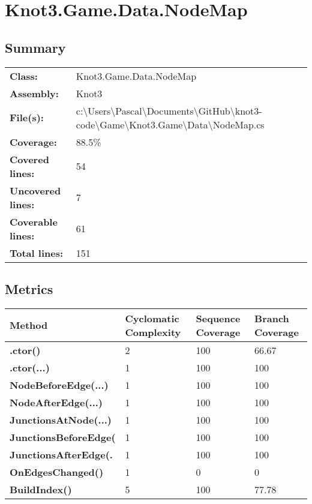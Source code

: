 \documentclass[a4paper,10pt]{article}
\begin{document}
\section{Knot3.Game.Data.NodeMap}
\subsection{Summary}
\begin{longtable}[l]{ll}
\textbf{Class:} & Knot3.Game.Data.NodeMap\\
\textbf{Assembly:} & Knot3\\
\textbf{File(s):} & \begin{minipage}[t]{12cm}{c:\textbackslash Users\textbackslash Pascal\textbackslash Documents\textbackslash GitHub\textbackslash knot3-code\textbackslash Game\textbackslash Knot3.Game\textbackslash Data\textbackslash NodeMap.cs}\end{minipage} \\
\textbf{Coverage:} & 88.5\%\\
\textbf{Covered lines:} & 54\\
\textbf{Uncovered lines:} & 7\\
\textbf{Coverable lines:} & 61\\
\textbf{Total lines:} & 151\\
\end{longtable}
\subsection{Metrics}
\begin{longtable}[l]{|l|l|l|l|}
\hline
\textbf{Method} & \textbf{Cyclomatic Complexity} & \textbf{Sequence Coverage} & \textbf{Branch Coverage}\\
\hline
\textbf{.ctor()} & 2 & 100 & 66.67\\
\hline
\textbf{.ctor(...)} & 1 & 100 & 100\\
\hline
\textbf{NodeBeforeEdge(...)} & 1 & 100 & 100\\
\hline
\textbf{NodeAfterEdge(...)} & 1 & 100 & 100\\
\hline
\textbf{JunctionsAtNode(...)} & 1 & 100 & 100\\
\hline
\textbf{JunctionsBeforeEdge(} & 1 & 100 & 100\\
\hline
\textbf{JunctionsAfterEdge(.} & 1 & 100 & 100\\
\hline
\textbf{OnEdgesChanged()} & 1 & 0 & 0\\
\hline
\textbf{BuildIndex()} & 5 & 100 & 77.78\\
\hline
\end{longtable}
\end{document}
